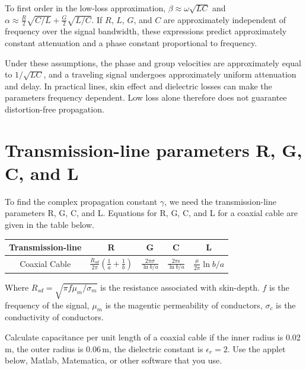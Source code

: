 \documentclass{ximera}
\begin{document}
\begin{itemize}
To first order in the low-loss approximation,
$\beta\approx\omega\sqrt{LC}$ and
$\alpha\approx\frac{R}{2}\sqrt{C/L}
+\frac{G}{2}\sqrt{L/C}$.
If $R$, $L$, $G$, and $C$ are approximately independent of
frequency over the signal bandwidth, these expressions
predict approximately constant attenuation and a phase
constant proportional to frequency.

Under these assumptions, the phase and group velocities
are approximately equal to $1/\sqrt{LC}$, and a traveling
signal undergoes approximately uniform attenuation and delay.
In practical lines, skin effect and dielectric losses can
make the parameters frequency dependent. Low loss alone
therefore does not guarantee distortion-free propagation.


\end{itemize}


\section{Transmission-line parameters R, G, C, and L}

To find the complex propagation constant $\gamma$, we need the transmission-line parameters R, G, C, and L. Equations for R, G, C, and L for a coaxial cable are given in the table below. 

\begin{center}
\begin{tabular}{|c|c|c|c|c|} \hline
Transmission-line    & R  & G & C &L     \\  \hline       
Coaxial Cable       & $\frac{R_{sd}}{2 \pi} \left(\frac{1}{a} +  \frac{1}{b} \right)$   & $\frac{2 \pi \sigma}{\ln b/a}$ &$\frac{2 \pi \epsilon}{\ln b/a}$& $\frac{\mu}{2 \pi } \ln b/a$                             \\ \hline    
\end{tabular}
\end{center}

Where $R_{sd} = \sqrt{\pi f \mu_m/\sigma_m}$ is the resistance associated with skin-depth. $f$ is the frequency of the signal, $\mu_m$ is the magentic permeability of conductors, $\sigma_c$ is the conductivity of conductors.

\begin{example}
Calculate capacitance per unit length of a coaxial cable if the inner radius is 0.02\,m, the outer radius is 0.06\,m, the dielectric constant is $\epsilon_r=2$. Use the applet below, Matlab, Matematica, or other software that you use.

\begin{center}  
\end{center} 

\end{example}
\end{document}
